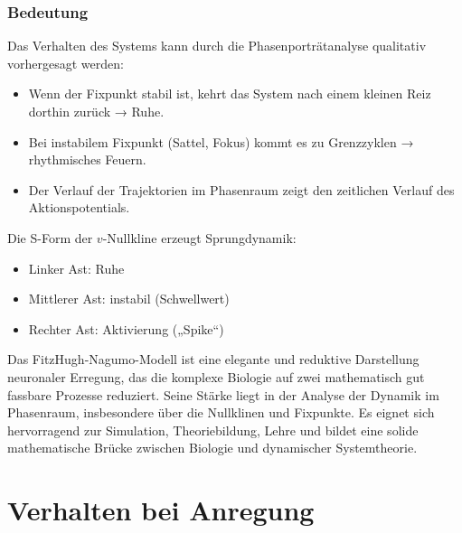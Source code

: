 \begin{refsection}
\subsubsection{Bedeutung}
Das Verhalten des Systems kann durch die Phasenporträtanalyse qualitativ vorhergesagt werden:
\begin{itemize}
	\item Wenn der Fixpunkt stabil ist, kehrt das System nach einem kleinen Reiz dorthin zurück → Ruhe.
	\item Bei instabilem Fixpunkt (Sattel, Fokus) kommt es zu Grenzzyklen → rhythmisches Feuern.
	\item Der Verlauf der Trajektorien im Phasenraum zeigt den zeitlichen Verlauf des Aktionspotentials.
\end{itemize}
Die S-Form der $v$-Nullkline erzeugt Sprungdynamik:
\begin{itemize}
	\item Linker Ast: Ruhe
	\item Mittlerer Ast: instabil (Schwellwert)
	\item Rechter Ast: Aktivierung („Spike“)
\end{itemize}
Das FitzHugh-Nagumo-Modell ist eine elegante und reduktive Darstellung neuronaler Erregung, das die komplexe Biologie auf zwei mathematisch gut fassbare Prozesse reduziert. Seine Stärke liegt in der Analyse der Dynamik im Phasenraum, insbesondere über die Nullklinen und Fixpunkte. Es eignet sich hervorragend zur Simulation, Theoriebildung, Lehre und bildet eine solide mathematische Brücke zwischen Biologie und dynamischer Systemtheorie.


\section{Verhalten bei Anregung}

\end{refsection}
